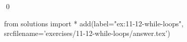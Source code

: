 
\begin{ex}
  \label{ex:11-12-while-loops}
  
  \qed
\end{ex}
\begin{python0}
from solutions import *
add(label="ex:11-12-while-loops",
    srcfilename='exercises/11-12-while-loops/answer.tex')
\end{python0}
